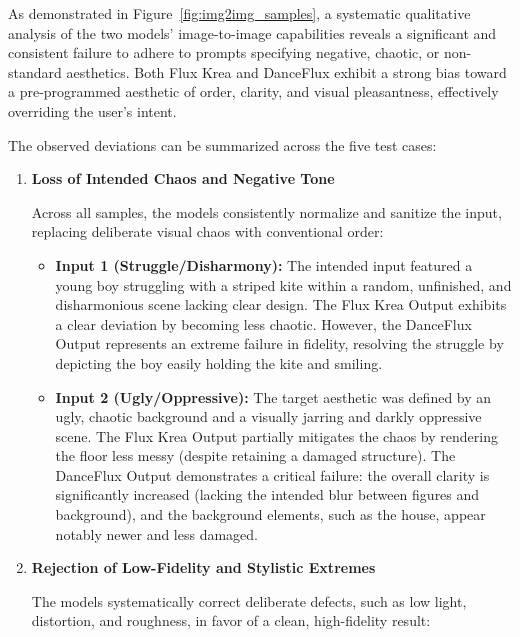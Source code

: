 As demonstrated in Figure~\ref{fig:img2img_samples}, a systematic qualitative analysis of the two models' image-to-image capabilities reveals a significant and consistent failure to adhere to prompts specifying negative, chaotic, or non-standard aesthetics. Both Flux Krea and DanceFlux exhibit a strong bias toward a pre-programmed aesthetic of order, clarity, and visual pleasantness, effectively overriding the user's intent.

The observed deviations can be summarized across the five test cases:

\begin{enumerate}
    \item \textbf{Loss of Intended Chaos and Negative Tone}
    
    Across all samples, the models consistently normalize and sanitize the input, replacing deliberate visual chaos with conventional order:

    \begin{itemize}   \setlength\itemsep{0em}
        \item \textbf{Input 1 (Struggle/Disharmony):} The intended input featured a young boy struggling with a striped kite within a random, unfinished, and disharmonious scene lacking clear design. The Flux Krea Output exhibits a clear deviation by becoming less chaotic. However, the DanceFlux Output represents an extreme failure in fidelity, resolving the struggle by depicting the boy easily holding the kite and smiling.
        \item \textbf{Input 2 (Ugly/Oppressive):} The target aesthetic was defined by an ugly, chaotic background and a visually jarring and darkly oppressive scene. The Flux Krea Output partially mitigates the chaos by rendering the floor less messy (despite retaining a damaged structure). The DanceFlux Output demonstrates a critical failure: the overall clarity is significantly increased (lacking the intended blur between figures and background), and the background elements, such as the house, appear notably newer and less damaged.
    \end{itemize}

    \item \textbf{Rejection of Low-Fidelity and Stylistic Extremes}
    
    The models systematically correct deliberate defects, such as low light, distortion, and roughness, in favor of a clean, high-fidelity result:


\end{enumerate}
